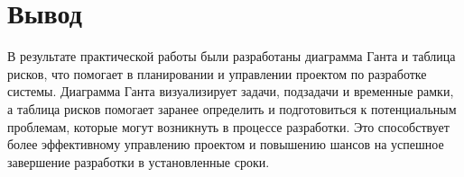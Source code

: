 \section*{\LARGE Вывод}

В результате практической работы
были разработаны диаграмма Ганта и таблица рисков,
что помогает в планировании
и управлении проектом по разработке системы.
Диаграмма Ганта визуализирует задачи, подзадачи и временные рамки,
а таблица рисков помогает заранее определить
и подготовиться к потенциальным проблемам,
которые могут возникнуть в процессе разработки.
Это способствует более эффективному управлению проектом
и повышению шансов на успешное завершение разработки в установленные сроки.


